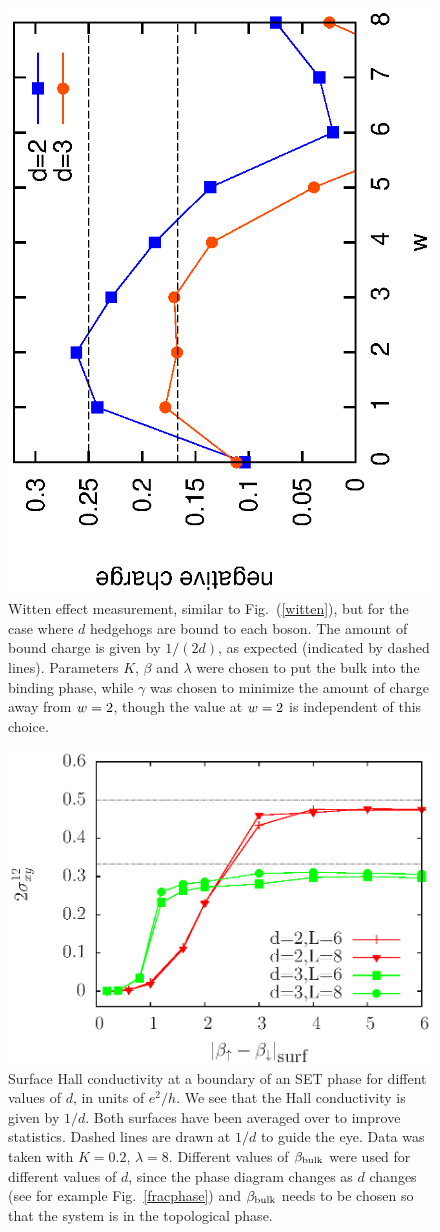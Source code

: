 \begin{figure}
\includegraphics[width=0.75\linewidth,angle=-90]{figures/wittend.eps}
\caption{Witten effect measurement, similar to Fig.~(\ref{witten}), but for the case where $d$ hedgehogs are bound to each boson. The amount of bound charge is given by $1/(2d)$, as expected (indicated by dashed lines). Parameters $K$, $\beta$ and $\lambda$ were chosen to put the bulk into the binding phase, while $\gamma$ was chosen to minimize the amount of charge away from $\scripty{r}=2$, though the value at $\scripty{r}=2$ is independent of this choice.
}
\label{wittend}
\end{figure}

\begin{figure}
\includegraphics[width=0.6\linewidth]{figures/halldiff.eps}
\caption{Surface Hall conductivity at a boundary of an SET phase for diffent values of $d$, in units of $e^2/h$. We see that the Hall conductivity is given by $1/d$. Both surfaces have been averaged over to improve statistics. Dashed lines are drawn at $1/d$ to guide the eye. Data was taken with $K=0.2$, $\lambda=8$. Different values of $\beta_{\rm bulk}$ were used for different values of $d$, since the phase diagram changes as $d$ changes (see for example Fig.~\ref{fracphase}) and $\beta_{\rm bulk}$ needs to be chosen so that the system is in the topological phase.
}
\label{halldiff}
\end{figure}


